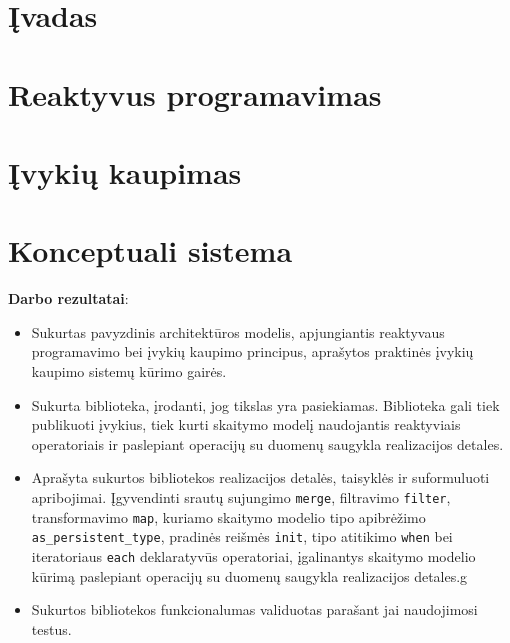 \documentclass{VUMIFPSmagistrinis}
\begin{document}

\tableofcontents

\section{Įvadas}


\section{Reaktyvus programavimas}


\section{Įvykių kaupimas}


\section{Konceptuali sistema}



\textbf{Darbo rezultatai}:

\begin{itemize}
  \item Sukurtas pavyzdinis architektūros modelis, apjungiantis reaktyvaus programavimo bei įvykių kaupimo principus, aprašytos praktinės įvykių kaupimo sistemų kūrimo gairės.
  \item Sukurta biblioteka, įrodanti, jog tikslas yra pasiekiamas. Biblioteka gali tiek publikuoti įvykius, tiek kurti skaitymo modelį naudojantis reaktyviais operatoriais ir paslepiant operacijų su duomenų saugykla realizacijos detales.
  \item Aprašyta sukurtos bibliotekos realizacijos detalės, taisyklės ir suformuluoti apribojimai. Įgyvendinti srautų sujungimo \lstinline|merge|, filtravimo \lstinline|filter|, transformavimo \lstinline|map|, kuriamo skaitymo modelio tipo apibrėžimo \lstinline|as_persistent_type|, pradinės reišmės \lstinline|init|, tipo atitikimo \lstinline|when| bei iteratoriaus \lstinline|each| deklaratyvūs operatoriai, įgalinantys skaitymo modelio kūrimą paslepiant operacijų su duomenų saugykla realizacijos detales.g
  \item Sukurtos bibliotekos funkcionalumas validuotas parašant jai naudojimosi testus.
\end{itemize}
\end{document}

